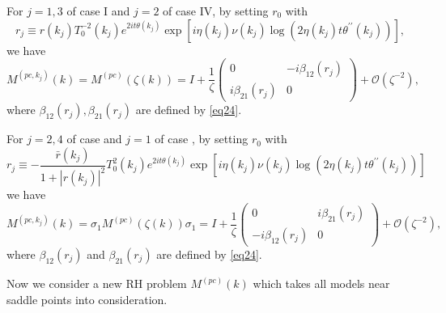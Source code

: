 \documentclass[11pt]{article}
\numberwithin{equation}{section}
\begin{document}
For $j=1,3$ of case I and $j=2$ of case IV,
by setting $r_0$ with
$$
 r_j\equiv r\left(k_j\right) T_0^{-2}(k_j) e^{2it\theta(k_j)}\exp {\left[i \eta(k_j) \nu\left(k_j\right) \log \left(2\eta(k_j) t \theta^{\prime \prime}\left(k_j\right)\right)\right]},
$$
we have
\begin{equation}\label{eq27}
M^{(pc, k_j)}( k) =  M^{(pc)} \left( \zeta(k)  \right)
 = I + \frac{1}{ \zeta}
\begin{pmatrix}
0 &  -i \beta_{12}(r_j)  \\
  i \beta_{21} (r_j) & 0
\end{pmatrix} + \mathcal{O}(\zeta^{-2}),
\end{equation}
where $ \beta_{12}(r_j),  \beta_{21}(r_j)$ are defined by \eqref{eq24}.

For $j=2,4$ of case \uppercase\expandafter{} and $j=1$ of case \uppercase\expandafter{},  by setting $r_0$ with
\begin{equation*}
    r_j\equiv -\frac{\bar r\left(k_j\right)}{ 1+|r(k_j)|^2} T_0^{ 2}(k_j) e^{2it\theta(k_j)}\exp {\left[i \eta(k_j) \nu\left(k_j\right) \log \left(2\eta(k_j) t \theta^{\prime \prime}\left(k_j\right)\right)\right]}
\end{equation*}
we have
\begin{equation}\label{eq27-1}
M^{(pc, k_j)}( k) =\sigma_1 M^{(pc)} \left( \zeta(k)  \right) \sigma_1
 = I + \frac{1}{ \zeta}
\begin{pmatrix}
0 &   i \beta_{21}(r_j)  \\
 - i \beta_{12}(r_j)  & 0
\end{pmatrix} + \mathcal{O}(\zeta^{-2}),
\end{equation}
where $\beta_{12}(r_j) $ and $\beta_{21} (r_j)$ are defined by \eqref{eq24}.



Now we consider a new RH problem $M^{(pc)}(k)$ which takes all models near saddle points into consideration.
\end{document}
